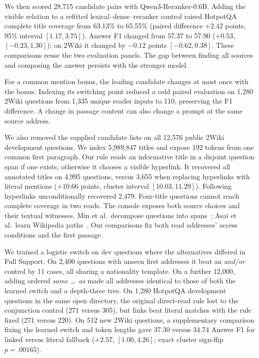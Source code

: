 \documentclass[conference]{IEEEtran}
\begin{document}
We then scored 28,715 candidate pairs with Qwen3-Reranker-0.6B. Adding the visible relation to a refitted lexical--dense--reranker control raised HotpotQA complete title coverage from 63.13\% to 65.55\% (paired difference $+2.42$ points, 95\% interval $[1.17,3.75]$). Answer F1 changed from 57.37 to 57.90 ($+0.53$, $[-0.23,1.30]$); on 2Wiki it changed by $-0.12$ points $[-0.62,0.38]$. These comparisons reuse the two evaluation panels. The gap between finding all sources and composing the answer persists with the stronger model.

For a common mention bonus, the leading candidate changes at most once with the bonus. Indexing its switching point reduced a cold paired evaluation on 1,280 2Wiki questions from 1,335 unique reader inputs to 110, preserving the F1 difference. A change in passage content can also change a prompt at the same source address.

We also removed the supplied candidate lists on all 12,576 public 2Wiki development questions. We index 5,989,847 titles and expose 192 tokens from one common first paragraph. Our rule reads an informative title in a disjoint question span if one exists; otherwise it chooses a visible hyperlink. It recovered all annotated titles on 4,995 questions, versus 3,655 when replacing hyperlinks with literal mentions ($+10.66$ points, cluster interval $[10.03,11.29]$). Following hyperlinks unconditionally recovered 2,479. Four-title questions cannot reach complete coverage in two reads. The console exposes both source choices and their textual witnesses. Min et al.\ decompose questions into spans~\cite{decomp}; Asai et al.\ learn Wikipedia paths~\cite{asai}. Our comparisons fix both read addresses' access conditions and the first passage.

We trained a logistic switch on dev questions where the alternatives differed in Full Support. On 2,400 questions with unseen first addresses it beat an \emph{and/or} control by 11 cases, all sharing a nationality template. On a further 12,000, adding ordered \emph{same \ldots\ as} made all addresses identical to those of both the learned switch and a depth-three tree. On 1,280 HotpotQA development questions in the same open directory, the original direct-read rule lost to the conjunction control (271 versus 305), but links beat literal matches with the rule fixed (271 versus 220). On 512 new 2Wiki questions, a supplementary comparison fixing the learned switch and token lengths gave 37.30 versus 34.74 Answer F1 for linked versus literal fallback ($+2.57$, $[1.00,4.26]$; exact cluster sign-flip $p=.00165$).
\end{document}
